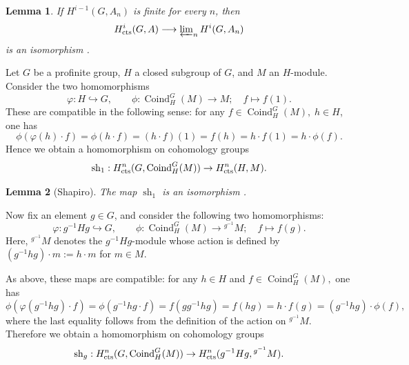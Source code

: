 \documentclass{article}
\numberwithin{equation}{section} %
\newtheorem{lemm}{Lemma}[section]
\begin{document}
        \begin{lemm}
            If $H^{i-1}(G,A_n)$ is finite for every $n$, then
            \[
              H^i_{\rm cts}(G,A)
              \longrightarrow
              \varprojlim\nolimits_n H^i(G,A_n)
            \]
            is an isomorphism \cite[Corollary~2.7.6]{NSW}.
        \end{lemm}
Let $G$ be a profinite group, $H$ a closed subgroup of $G$, and $M$ an $H$-module. Consider the two homomorphisms
        \[
          \varphi: H \hookrightarrow G,
          \qquad
          \phi:\operatorname{Coind}_H^G(M) \to M;
          \quad
          f \mapsto f(1).
        \]
        These are compatible in the following sense: for any $f \in \operatorname{Coind}_H^G(M), \; h \in H$, one has
        \[
          \phi(\varphi(h)\cdot f)
          =
          \phi(h\cdot f)
          =
          (h\cdot f)(1)
          =
          f(h)
          =
          h\cdot f(1)
          =
          h\cdot \phi(f).
        \]
        Hence we obtain a homomorphism on cohomology groups
        \[
          \operatorname{sh}_1:
          H_{\rm cts}^n(G,\operatorname{Coind}_H^G(M))
          \to
          H_{\rm cts}^n(H,M).
        \]

        \begin{lemm}[Shapiro]
            The map $\operatorname{sh}_1$ is an isomorphism
            \cite[Proposition~(1.6.4)]{NSW}.
        \end{lemm}

        Now fix an element $g\in G$, and consider the following two homomorphisms:
        \[
          \varphi: g^{-1}Hg \hookrightarrow G,
          \qquad
          \phi:\operatorname{Coind}_H^G(M) \to {}^{g^{-1}}M;
          \quad
          f \mapsto f(g).
        \]
        Here, ${}^{g^{-1}}M$ denotes the $g^{-1}Hg$-module whose action is defined by $(g^{-1}hg)\cdot m := h\cdot m$
        for $m\in M$.

        As above, these maps are compatible: for any $h\in H$ and
        $
        f \in \operatorname{Coind}_H^G(M),
        $
        one has
        \[
          \phi(\varphi(g^{-1}hg)\cdot f)
          =
          \phi(g^{-1}hg\cdot f)
          =
          f(gg^{-1}hg)
          =
          f(hg)
          =
          h\cdot f(g)
          =
          (g^{-1}hg)\cdot \phi(f),
        \]
        where the last equality follows from the definition of the action on ${}^{g^{-1}}M$.
        Therefore we obtain a homomorphism on cohomology groups
        \[
          \operatorname{sh}_g:
          H_{\rm cts}^n(G,\operatorname{Coind}_H^G(M))
          \to
          H_{\rm cts}^n(g^{-1}Hg,{}^{g^{-1}}M).
        \]
\end{document}
